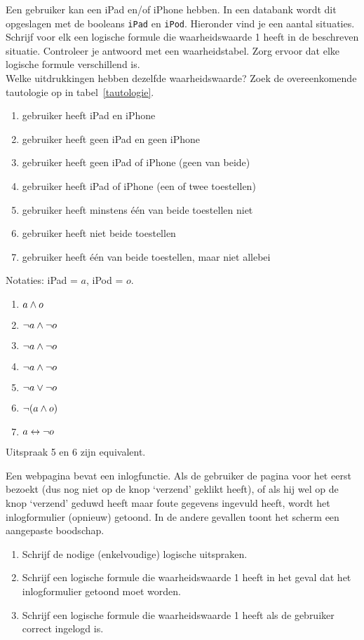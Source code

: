 \begin{oef}
 Een gebruiker kan een iPad en/of iPhone hebben. In een databank wordt dit opgeslagen met de booleans \verb+iPad+ en \verb+iPod+. Hieronder vind je een aantal situaties. Schrijf voor elk een logische formule die waarheidswaarde 1 heeft in de beschreven situatie. Controleer je antwoord met een waarheidstabel. Zorg ervoor dat elke logische formule verschillend is.
\\ Welke uitdrukkingen hebben dezelfde waarheidswaarde? Zoek de overeenkomende tautologie op in tabel~\ref{tautologie}.
\begin{enumerate}
  \item gebruiker heeft iPad en iPhone
  \item gebruiker heeft geen iPad en geen iPhone
  \item gebruiker heeft geen iPad of iPhone (geen van beide)
  \item gebruiker heeft iPad of iPhone  (een of twee toestellen) 
  \item gebruiker heeft minstens \'e\'en van beide toestellen niet
  \item gebruiker heeft niet beide toestellen
  \item gebruiker heeft \'e\'en van beide toestellen, maar niet allebei 
\end{enumerate}

\begin{opl}
Notaties: iPad = $a$, iPod = $o$.
\begin{enumerate}
  \item $a \wedge o$
  \item $\neg a \wedge \neg o$
  \item $\neg a \wedge \neg o$
  \item $\neg a \wedge \neg o$
  \item $\neg a \vee \neg o$
  \item $\neg (a \wedge o)$
  \item $a \leftrightarrow \neg o$
\end{enumerate}
Uitspraak 5 en 6 zijn equivalent.
\end{opl}
\end{oef}

\begin{oef}
 Een webpagina bevat een inlogfunctie. Als de gebruiker de pagina voor het eerst bezoekt (dus nog niet op de knop `verzend' geklikt heeft), of als hij wel op de knop `verzend' geduwd heeft maar foute gegevens ingevuld heeft, wordt het inlogformulier (opnieuw) getoond. In de andere gevallen toont het scherm een aangepaste boodschap. 
\begin{enumerate}
  \item Schrijf de nodige (enkelvoudige) logische uitspraken.
  \item Schrijf een logische formule die waarheidswaarde 1 heeft in het geval dat het inlogformulier getoond moet worden.
  \item Schrijf een logische formule die waarheidswaarde 1 heeft als de gebruiker correct ingelogd is.
\end{enumerate}
\end{oef}

